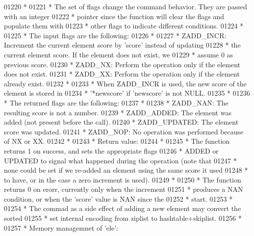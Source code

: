 \begin{DoxyCode}
01220 \textcolor{comment}{ *}
01221 \textcolor{comment}{ * The set of flags change the command behavior. They are passed with an integer}
01222 \textcolor{comment}{ * pointer since the function will clear the flags and populate them with}
01223 \textcolor{comment}{ * other flags to indicate different conditions.}
01224 \textcolor{comment}{ *}
01225 \textcolor{comment}{ * The input flags are the following:}
01226 \textcolor{comment}{ *}
01227 \textcolor{comment}{ * ZADD\_INCR: Increment the current element score by 'score' instead of updating}
01228 \textcolor{comment}{ *            the current element score. If the element does not exist, we}
01229 \textcolor{comment}{ *            assume 0 as previous score.}
01230 \textcolor{comment}{ * ZADD\_NX:   Perform the operation only if the element does not exist.}
01231 \textcolor{comment}{ * ZADD\_XX:   Perform the operation only if the element already exist.}
01232 \textcolor{comment}{ *}
01233 \textcolor{comment}{ * When ZADD\_INCR is used, the new score of the element is stored in}
01234 \textcolor{comment}{ * '*newscore' if 'newscore' is not NULL.}
01235 \textcolor{comment}{ *}
01236 \textcolor{comment}{ * The returned flags are the following:}
01237 \textcolor{comment}{ *}
01238 \textcolor{comment}{ * ZADD\_NAN:     The resulting score is not a number.}
01239 \textcolor{comment}{ * ZADD\_ADDED:   The element was added (not present before the call).}
01240 \textcolor{comment}{ * ZADD\_UPDATED: The element score was updated.}
01241 \textcolor{comment}{ * ZADD\_NOP:     No operation was performed because of NX or XX.}
01242 \textcolor{comment}{ *}
01243 \textcolor{comment}{ * Return value:}
01244 \textcolor{comment}{ *}
01245 \textcolor{comment}{ * The function returns 1 on success, and sets the appropriate flags}
01246 \textcolor{comment}{ * ADDED or UPDATED to signal what happened during the operation (note that}
01247 \textcolor{comment}{ * none could be set if we re-added an element using the same score it used}
01248 \textcolor{comment}{ * to have, or in the case a zero increment is used).}
01249 \textcolor{comment}{ *}
01250 \textcolor{comment}{ * The function returns 0 on erorr, currently only when the increment}
01251 \textcolor{comment}{ * produces a NAN condition, or when the 'score' value is NAN since the}
01252 \textcolor{comment}{ * start.}
01253 \textcolor{comment}{ *}
01254 \textcolor{comment}{ * The commad as a side effect of adding a new element may convert the sorted}
01255 \textcolor{comment}{ * set internal encoding from ziplist to hashtable+skiplist.}
01256 \textcolor{comment}{ *}
01257 \textcolor{comment}{ * Memory managemnet of 'ele':}

\end{DoxyCode}
